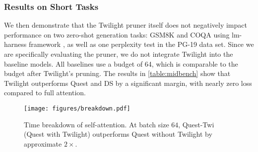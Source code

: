 \subsubsection{Results on Short Tasks}
\begin{table}[ht]
\caption{Evaluation on three short-context benchmarks.}
\label{table:midbench}
\begin{center}
\begin{small}
\end{small}
\end{center}
\end{table}
We then demonstrate that the Twilight pruner itself does not negatively impact performance on two zero-shot generation tasks: GSM8K and COQA using lm-harness framework \cite{gao2021framework}, as well as one perplexity test in the PG-19 data set. Since we are specifically evaluating the pruner, we do not integrate Twilight into the baseline models. All baselines use a budget of 64, which is comparable to the budget after Twilight's pruning. The results in \autoref{table:midbench} show that Twilight outperforms Quest and DS by a significant margin, with nearly zero loss compared to full attention.

\begin{figure}[t]
\begin{center}
\centerline{\texttt{[image: figures/breakdown.pdf]}}
\caption{Time breakdown of self-attention. At batch size $64$, Quest-Twi (Quest with Twilight) outperforms Quest without Twilight by approximate $2 \times$.}
\label{fig:breakdown}
\end{center}
\end{figure}

